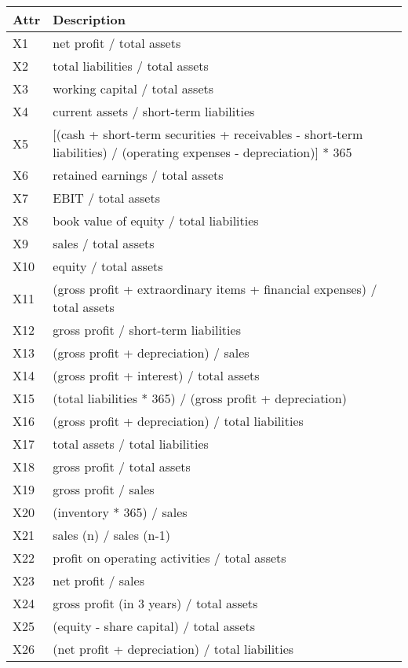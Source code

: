


\begin{table*}
\centering
\begin{tabular}[t]{|p{0.8cm}|p{6cm}| }
     \hline
     \textbf{Attr} & \textbf{Description} \\
     \hline
    X1	&	net profit / total assets \\
    X2	&	total liabilities / total assets \\
    X3	&	working capital / total assets \\
    X4	&	current assets / short-term liabilities \\
    X5	&	[(cash + short-term securities + receivables - short-term liabilities) / (operating expenses - depreciation)] * 365 \\
    X6	&	retained earnings / total assets \\
    X7	&	EBIT / total assets \\
    X8	&	book value of equity / total liabilities \\
    X9	&	sales / total assets \\
    X10	&	equity / total assets \\
    X11	&	(gross profit + extraordinary items + financial expenses) / total assets \\
    X12	&	gross profit / short-term liabilities \\
    X13	&	(gross profit + depreciation) / sales \\
    X14	&	(gross profit + interest) / total assets \\
    X15	&	(total liabilities * 365) / (gross profit + depreciation) \\
    X16	&	(gross profit + depreciation) / total liabilities \\
    X17	&	total assets / total liabilities \\
    X18	&	gross profit / total assets \\
    X19	&	gross profit / sales \\
    X20	&	(inventory * 365) / sales \\
    X21	&	sales (n) / sales (n-1) \\
    X22	&	profit on operating activities / total assets \\
    X23	&	net profit / sales \\
    X24	&	gross profit (in 3 years) / total assets \\
    X25	&	(equity - share capital) / total assets \\
    X26	&	(net profit + depreciation) / total liabilities \\

\end{tabular}
\end{table*}

